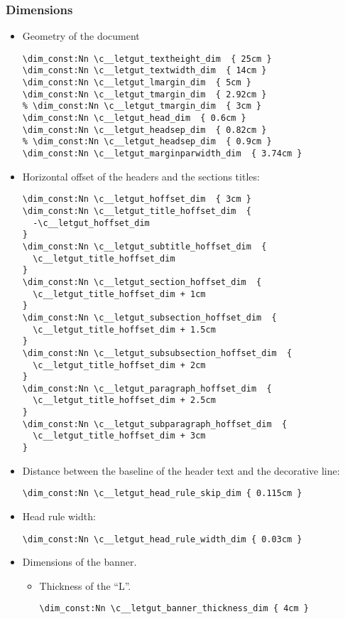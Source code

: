 \documentclass{letgut}
\begin{document}
\subsubsection{Dimensions}
\label{ImplementationDeclarationsDimensions-gj9g55h0jlj0}
\begin{itemize}
\item Geometry of the document
\begin{lstlisting}
\dim_const:Nn \c__letgut_textheight_dim  { 25cm }
\dim_const:Nn \c__letgut_textwidth_dim  { 14cm }
\dim_const:Nn \c__letgut_lmargin_dim  { 5cm }
\dim_const:Nn \c__letgut_tmargin_dim  { 2.92cm }
% \dim_const:Nn \c__letgut_tmargin_dim  { 3cm }
\dim_const:Nn \c__letgut_head_dim  { 0.6cm }
\dim_const:Nn \c__letgut_headsep_dim  { 0.82cm }
% \dim_const:Nn \c__letgut_headsep_dim  { 0.9cm }
\dim_const:Nn \c__letgut_marginparwidth_dim  { 3.74cm }
\end{lstlisting}
\item Horizontal offset of the headers and the sections titles:
\begin{lstlisting}
\dim_const:Nn \c__letgut_hoffset_dim  { 3cm }
\dim_const:Nn \c__letgut_title_hoffset_dim  {
  -\c__letgut_hoffset_dim
}
\dim_const:Nn \c__letgut_subtitle_hoffset_dim  {
  \c__letgut_title_hoffset_dim
}
\dim_const:Nn \c__letgut_section_hoffset_dim  {
  \c__letgut_title_hoffset_dim + 1cm
}
\dim_const:Nn \c__letgut_subsection_hoffset_dim  {
  \c__letgut_title_hoffset_dim + 1.5cm
}
\dim_const:Nn \c__letgut_subsubsection_hoffset_dim  {
  \c__letgut_title_hoffset_dim + 2cm
}
\dim_const:Nn \c__letgut_paragraph_hoffset_dim  {
  \c__letgut_title_hoffset_dim + 2.5cm
}
\dim_const:Nn \c__letgut_subparagraph_hoffset_dim  {
  \c__letgut_title_hoffset_dim + 3cm
}
\end{lstlisting}
\item Distance between the baseline of the header text and the decorative line:
\begin{lstlisting}
\dim_const:Nn \c__letgut_head_rule_skip_dim { 0.115cm }
\end{lstlisting}
\item Head rule width:
\begin{lstlisting}
\dim_const:Nn \c__letgut_head_rule_width_dim { 0.03cm }
\end{lstlisting}
\item Dimensions of the banner.
\begin{itemize}
\item Thickness of the “L”.
\begin{lstlisting}
\dim_const:Nn \c__letgut_banner_thickness_dim { 4cm }

\end{lstlisting}
\end{itemize}
\end{itemize}
\end{document}
